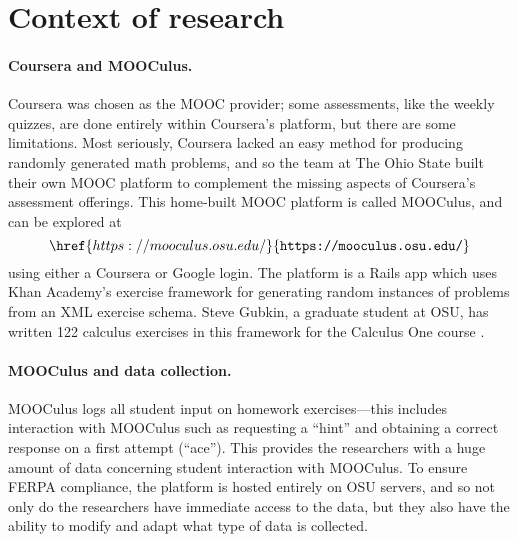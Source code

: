 \documentclass[12pt]{article}
\begin{document}
\section{Context of research}

\paragraph{Coursera and MOOCulus.} 
Coursera was chosen as the MOOC provider; some assessments, like the
weekly quizzes, are done entirely within Coursera's platform, but
there are some limitations.  Most seriously, Coursera lacked an easy
method for producing randomly generated math problems, and so the team
at The Ohio State built their own MOOC platform to complement the
missing aspects of Coursera's assessment offerings.  This home-built
MOOC platform is called MOOCulus, and can be explored at
\[
\href{https://mooculus.osu.edu/}{\texttt{https://mooculus.osu.edu/}}
\]
using either a Coursera or Google login.  The platform is a Rails app
which uses Khan Academy's exercise framework \parencite{khan-academy}
for generating random instances of problems from an XML exercise
schema.  Steve Gubkin, a graduate student at OSU, has written 122
calculus exercises in this framework for the Calculus One
course \parencite{steve-gubkin}.

\paragraph{MOOCulus and data collection.} 
MOOCulus logs all student input on homework exercises---this includes
interaction with MOOCulus such as requesting a ``hint'' and obtaining
a correct response on a first attempt (``ace'').  This provides the
researchers with a huge amount of data concerning student interaction
with MOOCulus.  To ensure FERPA compliance, the platform is hosted
entirely on OSU servers, and so not only do the researchers have
immediate access to the data, but they also have the ability to modify
and adapt what type of data is collected.
\end{document}
